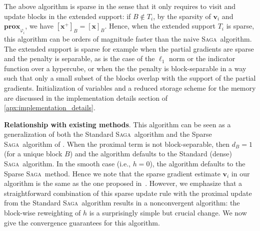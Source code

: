 \documentclass{article}
\def\prox{{\mathbf{prox}}}
\newcommand{\SAGA}{\textsc{Saga}}
\def\xx{{\boldsymbol x}}
\def\vv{{\boldsymbol v}}
\renewcommand{\llbracket}{[}
\renewcommand{\rrbracket}{]}
\begin{document}
The above algorithm is sparse in the sense that it only requires to visit and update blocks in the extended support: if $B \notin T_i$, by the sparsity of $\vv_i$ and $\prox_{\varphi_i}$, we have $\llbracket\xx^+\rrbracket_B = \llbracket\xx\rrbracket_B$.
Hence, when the extended support $T_i$ is sparse, this algorithm can be orders of magnitude faster than the naive \SAGA\ algorithm. The extended support is sparse for example when the partial gradients are sparse and the penalty is separable, as is the case of the $\ell_1$ norm or the indicator function over a hypercube, or when the the penalty is block-separable in a way such that only a small subset of the blocks overlap with the support of the partial gradients.
Initialization of variables and a reduced storage scheme for the memory are discussed in the implementation details section of \ref{apx:implementation_details}.


{\bfseries Relationship with existing methods}.
This algorithm can be seen as a generalization of both the Standard \SAGA\ algorithm and the Sparse \SAGA\ algorithm of \citet{leblond2016Asaga}.
When the proximal term is not block-separable, then $d_B=1$ (for a unique block $B$) and the algorithm defaults to the Standard (dense) \SAGA\ algorithm.
In the smooth case (i.e., $h=0$), the algorithm defaults to the Sparse \SAGA\ method.
Hence we note that the sparse gradient estimate $\vv_i$ in our algorithm is the same as the one proposed in~\citet{leblond2016Asaga}.
However, we emphasize that a straightforward combination of this sparse update rule with the proximal update from the Standard \SAGA\ algorithm results in a nonconvergent algorithm: the block-wise reweighting of $h$ is a surprisingly simple but crucial change.
We now give the convergence guarantees for this algorithm.
\end{document}
